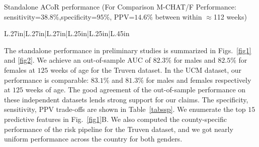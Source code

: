 \documentclass[onecolumn, compsoc,11pt]{IEEEtran}
\renewcommand{\captionN}[1]{\caption{\color{CadetBlue4!80!black} \sffamily \fontsize{9}{10}\selectfont #1  }}
\def\acor{ACoR\xspace}
\begin{document}
\begin{table}  
  \centering

  \vspace{-15pt}
  
\captionN{Standalone \acor performance (For Comparison M-CHAT/F Performance: sensitivity=$38.8\%$,specificity=$95\%$, PPV=$14.6\%$ between within $\approx$112 weeks)}\label{tabssp}
\fontsize{8}{8}\selectfont
  \vspace{-10pt}

  \begin{tabular}{L{.27in}|L{.27in}|L{.27in}|L{.25in}|L{.25in}|L{.45in}}
\hline

\end{tabular}
\end{table}  
The standalone performance in preliminary studies is summarized  in Figs.~\ref{fig1} and \ref{fig2}. 
We achieve an out-of-sample AUC of $82.3\%$ for males and $82.5\%$ for females at $125$ weeks of age for the Truven dataset. In the UCM dataset, our performance is comparable: $83.1\%$ and $81.3\%$ for males and females respectively at $125$ weeks of age. The good agreement of the out-of-sample performance on these independent datasets lends strong support for our claims. The specificity, sensitivity, PPV trade-offs are shown in Table~\ref{tabssp}. We enumerate the top $15$ predictive features in Fig.~\ref{fig1}B. 
We also computed the county-specific performance of the risk pipeline for the Truven dataset, and we got nearly uniform performance across the country for both genders. 
%
\end{document}
